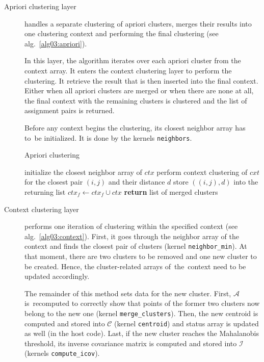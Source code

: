 \begin{description}
	\item[Apriori clustering layer] handles a separate clustering of apriori clusters, mer\-ges their results into one clustering context and performing the final clustering (see alg.~\ref{alg03:apriori}).
	
	In this layer, the algorithm iterates over each apriori cluster from the context array. It enters the context clustering layer to perform the clustering. It retrieve the result that is then inserted into the final context. Either when all apriori clusters are merged or when there are none at all, the final context with the remaining clusters is clustered and the list of assignment pairs is returned.
	
	Before any context begins the clustering, its closest neighbor array has to~be initialized. It is done by the kernels \texttt{neighbors}.
	
	
	\begin{algorithm}[t]
		\caption{Apriori clustering}
		\label{alg03:apriori}
		\begin{algorithmic}[1]
			 
			\State initialize the closest neighbor array of $ctx$ 
			\State perform context clustering of $cxt$ for the closest pair $(i,j)$ and their distance $d$
			\State store $((i,j),d)$ into the returning list
			\EndWhile
			\State $ctx_f \gets ctx_f \cup ctx$ 
			\EndFor
			\State \textbf{return} list of merged clusters
			\EndProcedure
		\end{algorithmic}
	\end{algorithm}

	\item[Context clustering layer] performs one iteration of clustering within the specified context (see alg.~\ref{alg03:context}). First, it goes through the neighbor array of the context and finds the closest pair of clusters (kernel \texttt{neighbor\_min}). At that moment, there are two clusters to be removed and one new cluster to be created. Hence, the cluster-related arrays of~the~context need to be updated accordingly.
	
	The remainder of this method sets data for the new cluster. First, $\mathcal{A}$ is~recomputed to correctly show that points of the former two clusters now belong to the new one (kernel \texttt{merge\_clusters}). Then, the new centroid is computed and stored into $\mathcal{C}$ (kernel \texttt{centroid}) and status array is updated as well (in the host code). Last, if the new cluster reaches the Mahalanobis threshold, its inverse covariance matrix is computed and stored into $\mathcal{I}$ (kernels \texttt{compute\_icov}). 
	

\end{description}
